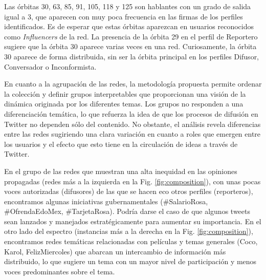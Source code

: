 Las órbitas 30, 63, 85, 91, 105, 118 y 125 son hablantes con un grado de salida igual a 3, que aparecen con muy poca frecuencia en las firmas de los perfiles identificados. Es de esperar que estas órbitas aparezcan en usuarios reconocidos como \textit{Influencers} de la red. La presencia de la órbita 29 en el perfil de Reportero sugiere que la órbita 30 aparece varias veces en una red. Curiosamente, la órbita 30 aparece de forma distribuida, sin ser la órbita principal en los perfiles Difusor, Conversador o Inconformista.

En cuanto a la agrupación de las redes, la metodología propuesta permite ordenar la colección y definir grupos interpretables que proporcionan una visión de la dinámica originada por los diferentes temas. Los grupos no responden a una diferenciación temática, lo que refuerza la idea de que los procesos de difusión en Twitter no dependen sólo del contenido. No obstante, el análisis revela diferencias entre las redes sugiriendo una clara variación en cuanto a roles que emergen entre los usuarios y el efecto que esto tiene en la circulación de ideas a través de Twitter. 

En el grupo de las redes que muestran una alta inequidad en las opiniones propagadas (redes más a la izquierda en la Fig. \ref{fig:composition}), con unas pocas voces autorizadas (difusores) de las que se hacen eco otros perfiles (reporteros), encontramos algunas iniciativas gubernamentales (\#SalarioRosa, \#OfrendaEdoMex, \#TarjetaRosa). Podría darse el caso de que algunos tweets sean lanzados y manejados estratégicamente para aumentar su importancia. En el otro lado del espectro (instancias más a la derecha en la Fig. \ref{fig:composition}), encontramos redes temáticas relacionadas con películas y temas generales (Coco, Karol, FelizMiercoles) que abarcan un intercambio de información más distribuido, lo que sugiere un tema con un mayor nivel de participación y menos voces predominantes sobre el tema. 


